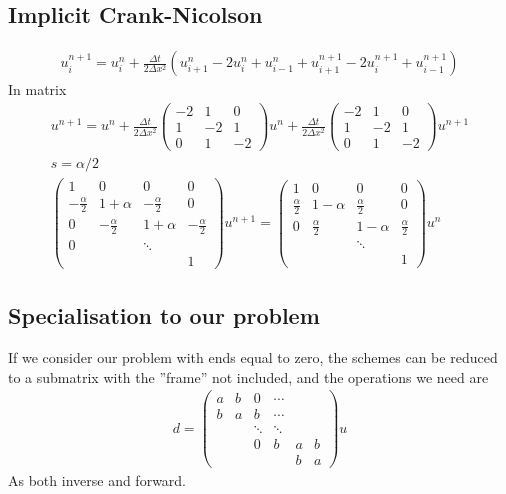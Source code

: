 \documentclass[11pt,a4paper,draft]{article}
\numberwithin{equation}{section}
\begin{document}
\subsection{Implicit Crank-Nicolson}
\begin{gather}
u_i^{n+1} = u_i^n + \frac{\Delta t}{2\Delta x^2}\left(
u_{i+1}^n - 2u_i^n + u_{i-1}^n + u_{i+1}^{n+1} - 2u_i^{n+1} + u_{i-1}^{n+1}
\right)
\end{gather}
In matrix
\begin{gather}
u^{n+1} = u^n + \frac{\Delta t}{2\Delta x^2}
\begin{pmatrix}
-2 & 1 & 0\\
1 & -2 & 1\\
0 & 1 & -2
\end{pmatrix} u^n
 + \frac{\Delta t}{2\Delta x^2}
\begin{pmatrix}
-2 & 1 & 0\\
1 & -2 & 1\\
0 & 1 & -2
\end{pmatrix}u^{n+1}\\
s = \alpha/2\\
\begin{pmatrix}
1 & 0 & 0 & 0\\
-\frac{\alpha}{2} & 1 + \alpha & -\frac{\alpha}{2} & 0\\
0 & -\frac{\alpha}{2} & 1 + \alpha & -\frac{\alpha}{2}\\
0 & & \ddots\\
&&& 1
\end{pmatrix}
u^{n+1} = 
\begin{pmatrix}
1 & 0 & 0 & 0\\
\frac{\alpha}{2} & 1 - \alpha & \frac{\alpha}{2} &  0\\
0 & \frac{\alpha}{2} & 1 - \alpha & \frac{\alpha}{2}\\
&& \ddots\\
&&&1
\end{pmatrix}u^n
\end{gather}


\subsection{Specialisation to our problem}

If we consider our problem with ends equal to zero, the schemes can 
be reduced to a submatrix with the ''frame'' not included,
and the operations we need are 
\begin{gather}
d = 
\begin{pmatrix}
a & b & 0 & \cdots\\
b & a & b & \cdots\\
&&\ddots & \ddots\\
&&0& b& a & b\\
&&&&b&a
\end{pmatrix}u
\end{gather}
As both inverse and forward.
\end{document}
